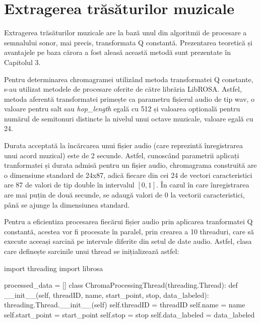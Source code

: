 \documentclass[a4paper,12pt]{report}
\begin{document}

\newpage
\section{Extragerea trăsăturilor muzicale}
Extragerea trăsăturilor muzicale are la bază unul din algoritmii de 
procesare a semnalului sonor, mai precis, transformata Q constantă. 
Prezentarea teoretică și avantajele pe baza cărora a fost aleasă 
această metodă sunt prezentate în Capitolul 3. 

Pentru determinarea chromagramei utilizând metoda transformatei Q constante, 
s-au utilizat metodele de procesare oferite de către librăria LibROSA.
Astfel, metoda aferentă transformatei primește ca parametru fișierul 
audio de tip wav, o valoare pentru salt sau \emph{hop{\_}length} egală
cu 512 și valoarea opțională pentru numărul de semitonuri distincte 
la nivelul unui octave muzicale, valoare egală cu 24. 

Durata acceptată la încărcarea unui fișier audio (care reprezintă 
înregistrarea unui acord muzical) este de 2 secunde. Astfel, 
cunoscând parametrii aplicați tranformatei și durata admisă pentru
un fișier audio, chromagrama construită are o dimensiune standard 
de 24x87, adică fiecare din cei 24 de vectori caracteristici are 
87 de valori de tip double în intervalul $[0,1]$.
În cazul în care înregistrarea are mai puțin de două secunde, se adaugă valori de 0 
la vectorii caracteristici, 
până se ajunge la dimensiunea standard.

Pentru a eficientiza procesarea fiecărui fișier audio prin 
aplicarea tranformatei Q constantă, acestea vor fi procesate 
în paralel, prin crearea a 10 threaduri, care să execute 
aceeași sarcină pe intervale diferite din setul de date audio.
Astfel, clasa care definește sarcinile unui thread se inițializează 
astfel: 
\begin{python}
    import threading
    import librosa

    processed_data = []
    class ChromaProcessingThread(threading.Thread):
        def __init__(self, threadID, name, start_point, stop, data_labeled):
            threading.Thread.__init__(self)
            self.threadID = threadID
            self.name = name
            self.start_point = start_point
            self.stop = stop
            self.data_labeled = data_labeled
\end{python}
\end{document}

